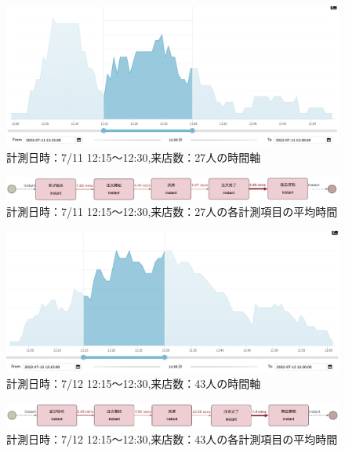 \documentclass{jsarticle}
\begin{document}
\begin{figure}[H]
  \centering
  \includegraphics[width=14cm]{711a.png}
  \caption{計測日時：7/11 12:15〜12:30,来店数：27人の時間軸}
  \label{fig:711a}
\end{figure}

\begin{figure}[H]
  \centering
  \includegraphics[width=15cm]{711b.png}
  \caption{計測日時：7/11 12:15〜12:30,来店数：27人の各計測項目の平均時間}
  \label{fig:711b}
\end{figure}


\begin{figure}[H]
  \centering
  \includegraphics[width=14cm]{712a.png}
  \caption{計測日時：7/12 12:15〜12:30,来店数：43人の時間軸}
  \label{fig:712a}
\end{figure}

\begin{figure}[H]
  \centering
  \includegraphics[width=15cm]{712b.png}
  \caption{計測日時：7/12 12:15〜12:30,来店数：43人の各計測項目の平均時間}
  \label{fig:712b}
\end{figure}
\end{document}
